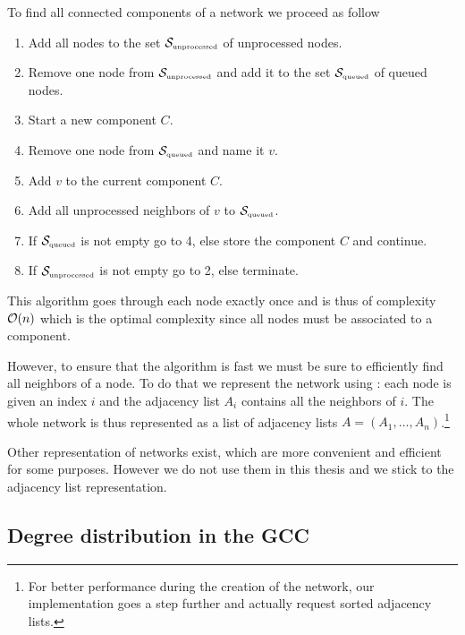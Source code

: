\documentclass[
11pt, %
american, %
singlespacing, %
final, %
nolistspacing, %
liststotoc, %
headsepline, %
]{MastersDoctoralThesis} %
\begin{document}
To find all connected components of a network we proceed as follow
\begin{enumerate}
	\item Add all nodes to the set $\mathcal{S}_{\text{\tiny unprocessed}}$ of unprocessed nodes.
	\item Remove one node from $\mathcal{S}_{\text{\tiny unprocessed}}$ and add it to the set $\mathcal{S}_{\text{\tiny queued}}$ of queued nodes.
	\item Start a new component $C$.
	\item Remove one node from $\mathcal{S}_{\text{\tiny queued}}$ and name it $v$.
	\item Add $v$ to the current component $C$.
	\item Add all unprocessed neighbors of $v$ to $\mathcal{S}_{\text{\tiny queued}}$.
	\item If $\mathcal{S}_{\text{\tiny queued}}$ is not empty go to 4, else store the component $C$ and continue.
	\item If $\mathcal{S}_{\text{\tiny unprocessed}}$ is not empty go to 2, else terminate.
\end{enumerate}
This algorithm goes through each node exactly once and is thus of complexity $\mathcal{O}\!\left(n\right)$ which is the optimal complexity since all nodes must be associated to a component.

However, to ensure that the algorithm is fast we must be sure to efficiently find all neighbors of a node. To do that we represent the network using : each node is given an index $i$ and the adjacency list $A_i$ contains all the neighbors of $i$. The whole network is thus represented as a list of adjacency lists $A = (A_1, \dots, A_n)$.\footnote{For better performance during the creation of the network, our implementation goes a step further and actually request sorted adjacency lists.}

Other representation of networks exist, which are more convenient and efficient for some purposes. However we do not use them in this thesis and we stick to the adjacency list representation.

\subsection{Degree distribution in the GCC}
\label{Section: Degree distribution in the GCC}
\end{document}

